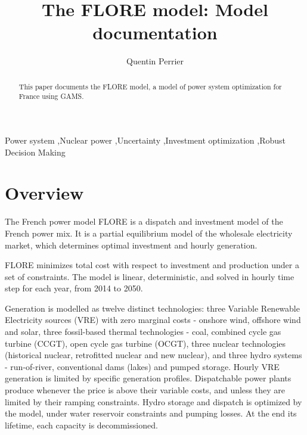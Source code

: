 \documentclass[authoryear]{elsarticle}
\begin{document}
%
	
	
\title{The FLORE model: Model documentation}


\author[mymainaddress]{Quentin Perrier}


\address[mymainaddress]{CIRED, 45 bis, avenue de la Belle Gabrielle, 94736 Nogent-sur-Marne Cedex, France}

\begin{frontmatter}
	
	\begin{abstract}
This paper documents the FLORE model, a model of power system optimization for France using GAMS.		
	\end{abstract}
	
	\begin{keyword}
		Power system \sep Nuclear power \sep Uncertainty \sep Investment optimization \sep Robust Decision Making 
	\end{keyword}
	
\end{frontmatter}

\tableofcontents

\clearpage

\section{Overview}
The French power model FLORE is a dispatch and investment model of the French power mix. It is a partial equilibrium model of the wholesale electricity market, which determines optimal investment and hourly generation.

FLORE minimizes total cost with respect to investment and production under a set of constraints. The model is linear, deterministic, and solved in hourly time step for each year, from 2014 to 2050.

Generation is modelled as twelve distinct technologies: three Variable Renewable Electricity sources (VRE) with zero marginal costs - onshore wind, offshore wind and solar, three fossil-based thermal technologies - coal, combined cycle gas turbine (CCGT), open cycle gas turbine (OCGT), three nuclear technologies (historical nuclear, retrofitted nuclear and new nuclear), and three hydro systems - run-of-river, conventional dams (lakes) and pumped storage. 
Hourly VRE generation is limited by specific generation profiles.
Dispatchable power plants produce whenever the price is above their variable costs, and unless they are limited by their ramping constraints.
Hydro storage and dispatch is optimized by the model, under water reservoir constraints and pumping losses.
At the end its lifetime, each capacity is decommissioned.
\end{document}
